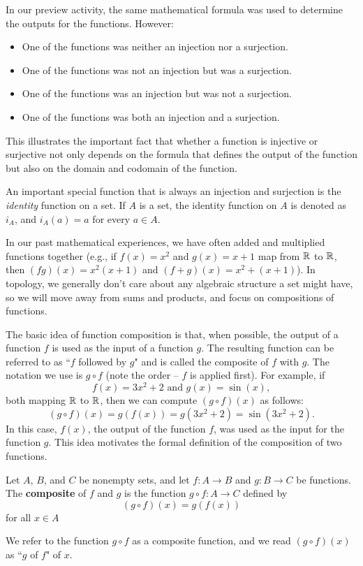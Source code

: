 In our preview activity, the same mathematical formula was used to determine the outputs for the functions. However:
\begin{itemize}
\item One of the functions was neither an injection nor a surjection. 
\item One of the functions was not an injection but was a surjection.
\item One of the functions was an injection but was not a surjection.
\item One of the functions was both an injection and a surjection.
\end{itemize}
This illustrates the important fact that whether a function is injective or surjective not only depends on the formula that defines the output of the function but also on the domain and codomain of the function.

An important special function that is always an injection and surjection is the \emph{identity} function on a set. If $A$ is a set, the identity function on $A$ is denoted as $i_A$, and $i_A(a) = a$ for every $a \in A$. 

\label{sec_comp_func}

In our past mathematical experiences, we have often added and multiplied functions together (e.g., if $f(x) = x^2$ and $g(x) = x+1$ map from $\mathbb{R}$ to $\mathbb{R}$, then $(fg)(x) = x^2(x+1)$ and $(f+g)(x) = x^2+(x+1)$).  In topology, we generally don't care about any algebraic structure a set might have, so we will move away from sums and products, and focus on compositions of functions.  

The basic idea of function composition is that, when possible, the output of a function $f$ is used as the input of a function $g$. The resulting function can be referred to as ``$f$ followed by $g$" and is called the composite of $f$ with $g$. The notation we use is $g \circ f$ (note the order -- $f$ is applied first). For example, if
\[f(x) = 3x^2 + 2 \text{ and } g(x) = \sin(x),\]
both mapping $\mathbb{R}$ to $\mathbb{R}$, then we can compute $(g \circ f)(x)$ as follows:
\[(g \circ f)(x) = g(f(x)) = g(3x^2 + 2) = \sin\left(3x^2 + 2\right).\]
In this case, $f(x)$, the output of the function $f$, was used as the input for the function $g$. This idea motivates the formal definition of the composition of two functions.

\begin{definition} Let $A$, $B$, and $C$ be nonempty sets, and let $f : A \to B$ and $g : B \to C$ be functions. The \textbf{composite} of $f$ and $g$ is the function $g \circ f : A \to C$ defined by
\[(g \circ f)(x) = g(f(x))\]
for all $x \in A$
\end{definition}
We refer to the function $g \circ f$ as a composite function, and we read $(g \circ f)(x)$ as ``$g$ of $f$" of $x$.

